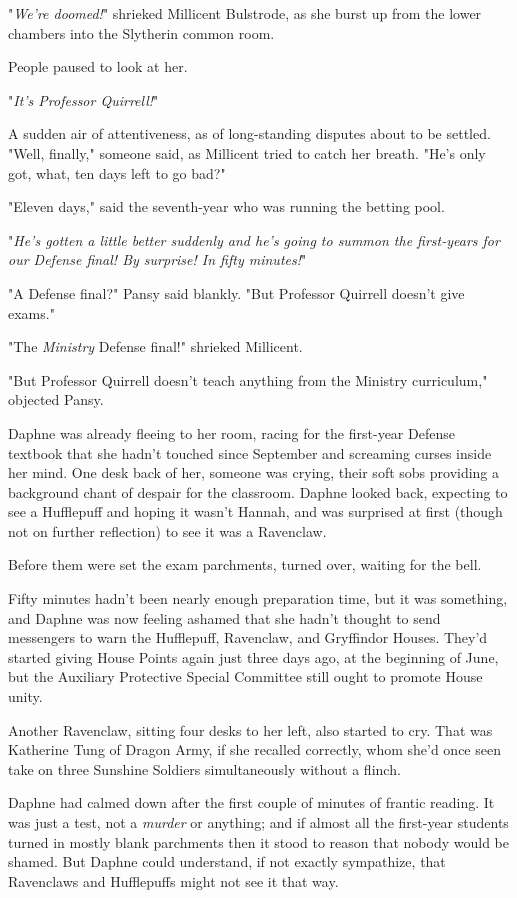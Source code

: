 "\emph{We're doomed!}" shrieked Millicent Bulstrode, as she burst up from the 
lower chambers into the Slytherin common room.

People paused to look at her.

"\emph{It's Professor Quirrell!}"

A sudden air of attentiveness, as of long-standing disputes about to be 
settled. "Well, finally," someone said, as Millicent tried to catch her breath. 
"He's only got, what, ten days left to go bad?"

"Eleven days," said the seventh-year who was running the betting pool.

"\emph{He's gotten a little better suddenly and he's going to summon the 
first-years for our Defense final! By surprise! In fifty minutes!}"

"A Defense final?" Pansy said blankly. "But Professor Quirrell doesn't give 
exams."

"The \emph{Ministry} Defense final!" shrieked Millicent.

"But Professor Quirrell doesn't teach anything from the Ministry curriculum," 
objected Pansy.

Daphne was already fleeing to her room, racing for the first-year Defense 
textbook that she hadn't touched since September and screaming curses inside 
her mind.
\sbreak
One desk back of her, someone was crying, their soft sobs providing a 
background chant of despair for the classroom. Daphne looked back, expecting to 
see a Hufflepuff and hoping it wasn't Hannah, and was surprised at first 
(though not on further reflection) to see it was a Ravenclaw.

Before them were set the exam parchments, turned over, waiting for the bell.

Fifty minutes hadn't been nearly enough preparation time, but it was something, 
and Daphne was now feeling ashamed that she hadn't thought to send messengers 
to warn the Hufflepuff, Ravenclaw, and Gryffindor Houses. They'd started giving 
House Points again just three days ago, at the beginning of June, but the 
Auxiliary Protective Special Committee still ought to promote House unity.

Another Ravenclaw, sitting four desks to her left, also started to cry. That 
was Katherine Tung of Dragon Army, if she recalled correctly, whom she'd once 
seen take on three Sunshine Soldiers simultaneously without a flinch.

Daphne had calmed down after the first couple of minutes of frantic reading. It 
was just a test, not a \emph{murder} or anything; and if almost all the 
first-year students turned in mostly blank parchments then it stood to reason 
that nobody would be shamed. But Daphne could understand, if not exactly 
sympathize, that Ravenclaws and Hufflepuffs might not see it that way.

